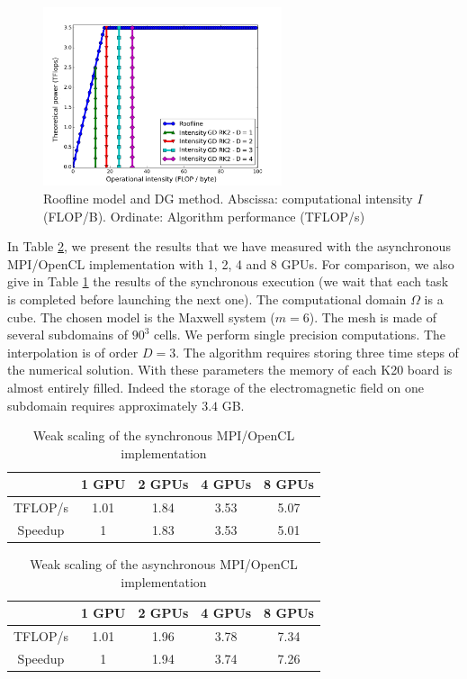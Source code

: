 \documentclass{svmult}
\begin{document}
\begin{figure}[h]
  \centering
\includegraphics[width=7cm]{roof_line_clac2}
  \caption{Roofline model and DG method. Abscissa: computational
    intensity $I$ (FLOP/B). Ordinate: Algorithm performance
    (TFLOP/s) \label{fig:roofline}}
\end{figure}

In Table \ref{tab:async-perfs}, we present the results that we have
measured with the asynchronous MPI/OpenCL implementation with 1, 2, 4
and 8 GPUs. For comparison, we also give in Table \ref{tab:sync-perfs}
the results of the synchronous execution (we wait that each task is
completed before launching the next one). The computational domain
$\Omega$ is a cube. The chosen model is the Maxwell system
($m=6$). The mesh is made of several subdomains of $90^3$ cells. We
perform single precision computations. The interpolation is of order
$D=3$. The algorithm requires storing three time steps of the
numerical solution. With these parameters the memory of each K20 board
is almost entirely filled. Indeed the storage of the electromagnetic
field on one subdomain requires approximately $3.4$ GB.

\begin{table}[htp]
  \begin{center}
    \caption{Weak scaling of the synchronous MPI/OpenCL
      implementation \label{tab:sync-perfs}}
    \begin{tabular}{|c|c|c|c|c|}
      \hline
      & 1 GPU & 2 GPUs & 4 GPUs & 8 GPUs\tabularnewline
      \hline
      \hline
      TFLOP/s & 1.01 & 1.84 & 3.53 & 5.07\tabularnewline
      \hline
      Speedup & 1 & 1.83 & 3.53 & 5.01\tabularnewline
      \hline
    \end{tabular}
  \end{center}
\end{table}%

\begin{table}[htp]
  \begin{center}
    \caption{Weak scaling of the asynchronous MPI/OpenCL implementation \label{tab:async-perfs}}
    \begin{tabular}{|c|c|c|c|c|}
      \hline
      & 1 GPU & 2 GPUs & 4 GPUs & 8 GPUs\tabularnewline
      \hline
      \hline
      TFLOP/s & 1.01 & 1.96 & 3.78 & 7.34\tabularnewline
      \hline
      Speedup & 1 & 1.94 & 3.74 & 7.26\tabularnewline
      \hline
    \end{tabular}
  \end{center}
\end{table}%
\end{document}
